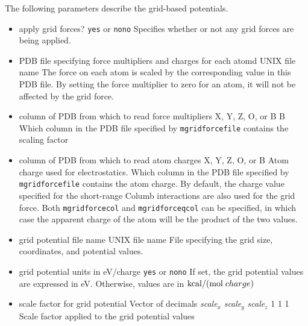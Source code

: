 The following parameters describe the grid-based potentials.

\begin{itemize}

\item
{}
{apply grid forces?}
{{\tt yes} or {\tt no}}{{\tt no}}
{Specifies whether or not any grid forces are being applied.}

\item
{}
{PDB file specifying force multipliers and charges for each atomd}
{UNIX file name}
{The force on each atom is scaled by the corresponding value in this PDB file. By setting the force multiplier to zero for an atom, it will not be affected by the grid force. }

\item
{}
{column of PDB from which to read force multipliers}
{X, Y, Z, O, or B}
{B}
{Which column in the PDB file specified by {\tt mgridforcefile} contains the scaling factor}

\item
{}
{column of PDB from which to read atom charges}
{X, Y, Z, O, or B}
{Atom charge used for electrostatics.} 
{Which column in the PDB file specified by {\tt mgridforcefile} contains the atom charge. By default, the charge value specified for the short-range Columb interactions are also used for the grid force. Both {\tt mgridforcecol} and {\tt mgridforceqcol} can be specified, in which case the apparent charge of the atom will be the product of the two values.}

\item
{}
{grid potential file name}
{UNIX file name}
{File specifying the grid size, coordinates, and potential values.}

\item
{}
{grid potential units in eV/charge}
{{\tt yes} or {\tt no}}{{\tt no}}
{If set, the grid potential values are expressed in {\rm eV}. Otherwise, values are
in ${\rm kcal} / ({\rm mol} \; charge)$}

\item
{}
{scale factor for grid potential}
{Vector of decimals {\it scale}$_x$ {\it scale}$_y$ {\it scale}$_z$ }
{1 1 1}
{Scale factor applied to the grid potential values}


\end{itemize}
